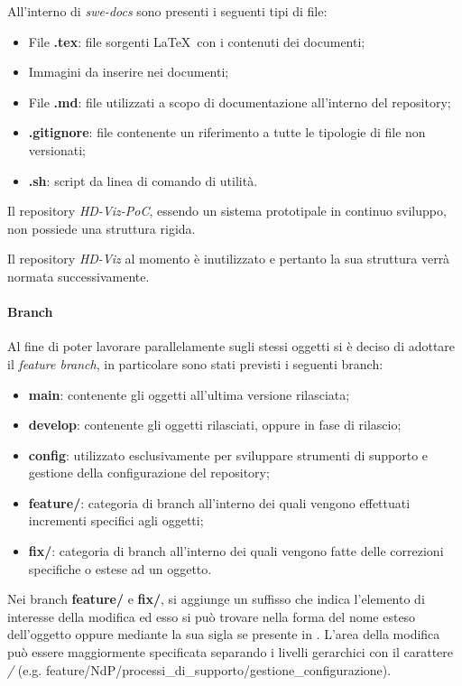 All'interno di \emph{swe-docs} sono presenti i seguenti tipi di file:
\begin{itemize}
    \item File \textbf{.tex}: file sorgenti \LaTeX\ con i contenuti dei documenti;
    \item Immagini da inserire nei documenti;
    \item File \textbf{.md}: file utilizzati a scopo di documentazione all'interno del repository;
    \item \textbf{.gitignore}: file contenente un riferimento a tutte le tipologie di file non versionati;
    \item \textbf{.sh}: script da linea di comando di utilità.
\end{itemize}


Il repository \emph{HD-Viz-PoC}, essendo un sistema prototipale in continuo sviluppo, non possiede una struttura rigida.

Il repository \emph{HD-Viz} al momento è inutilizzato e pertanto la sua struttura verrà normata successivamente.
%

\paragraph{Branch}
\label{par:gestione_configurazione:branching}

Al fine di poter lavorare parallelamente sugli stessi oggetti si è deciso di adottare il  \emph{feature branch}, in
particolare sono stati previsti i seguenti branch:
\begin{itemize}
	\item \textbf{main}: contenente gli oggetti all'ultima versione rilasciata;
	\item \textbf{develop}: contenente gli oggetti rilasciati, oppure in fase di rilascio;
	\item \textbf{config}: utilizzato esclusivamente per sviluppare strumenti di supporto e gestione della configurazione del repository;
	\item \textbf{feature/}: categoria di branch all'interno dei quali vengono effettuati incrementi specifici agli oggetti;
	\item \textbf{fix/}: categoria di branch all'interno dei quali vengono fatte delle correzioni specifiche o estese ad un oggetto.
\end{itemize}
Nei branch \textbf{feature/} e \textbf{fix/}, si aggiunge un suffisso che indica l'elemento di interesse della modifica ed esso si può trovare
nella forma del nome esteso dell'oggetto oppure mediante la sua sigla se presente in . L'area della modifica può essere
maggiormente specificata separando i livelli gerarchici con il carattere \emph{/} (e.g. feature/NdP/processi\_di\_supporto/gestione\_configurazione).

